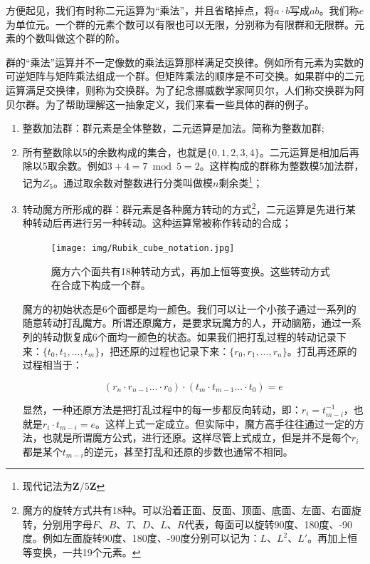 \documentclass[b5paper]{ctexart}
\begin{document}
方便起见，我们有时称二元运算为“乘法”，并且省略掉点，将$a \cdot b$写成$ab$。我们称$e$为单位元。一个群的元素个数可以有限也可以无限，分别称为有限群和无限群。元素的个数叫做这个群的阶。

群的“乘法”运算并不一定像数的乘法运算那样满足交换律。例如所有元素为实数的可逆矩阵与矩阵乘法组成一个群。但矩阵乘法的顺序是不可交换。如果群中的二元运算满足交换律，则称为交换群。为了纪念挪威数学家阿贝尔，人们称交换群为阿贝尔群。为了帮助理解这一抽象定义，我们来看一些具体的群的例子。

\begin{enumerate}
\item 整数加法群：群元素是全体整数，二元运算是加法。简称为整数加群;
\item 所有整数除以5的余数构成的集合，也就是$\{0, 1, 2, 3, 4\}$。二元运算是相加后再除以5取余数。例如$3 + 4 = 7 \bmod 5 = 2$。这样构成的群称为整数模5加法群，记为$Z_5$。通过取余数对整数进行分类叫做模$n$剩余类\footnote{现代记法为$\pmb{Z}/5\pmb{Z}$}；
\item 转动魔方所形成的群：群元素是各种魔方转动的方式\footnote{魔方的旋转方式共有18种。可以沿着正面、反面、顶面、底面、左面、右面旋转，分别用字母$F$、$B$、$T$、$D$、$L$、$R$代表，每面可以旋转90度、180度、-90度。例如左面旋转90度、180度、-90度分别可以记为：$L$、$L^2$、$L'$\cite{Wiki-Rubik-Cube-group}。再加上恒等变换，一共19个元素。}，二元运算是先进行某种转动后再进行另一种转动。这种运算常被称作转动的合成；

\begin{figure}[htbp]
 \centering
 \texttt{[image: img/Rubik\_cube\_notation.jpg]}
 \caption{魔方六个面共有18种转动方式，再加上恒等变换。这些转动方式在合成下构成一个群。}
 \label{fig:Rubik-cube-notation}
\end{figure}

魔方的初始状态是6个面都是均一颜色。我们可以让一个小孩子通过一系列的随意转动打乱魔方。所谓还原魔方，是要求玩魔方的人，开动脑筋，通过一系列的转动恢复成6个面均一颜色的状态。如果我们把打乱过程的转动记录下来：$\{t_0, t_1, ..., t_m\}$，把还原的过程也记录下来：$\{r_0, r_1, ..., r_n\}$。打乱再还原的过程相当于：

\[
  (r_n \cdot r_{n-1} ... \cdot r_0) \cdot (t_m \cdot t_{m-1} ... \cdot t_0) = e
\]

显然，一种还原方法是把打乱过程中的每一步都反向转动，即：$r_i = t_{m-i}^{-1}$，也就是$r_i \cdot t_{m-i} = e$。这样上式一定成立。但实际中，魔方高手往往通过一定的方法，也就是所谓魔方公式，进行还原。这样尽管上式成立，但是并不是每个$r_i$都是某个$t_{m-i}$的逆元，甚至打乱和还原的步数也通常不相同。


\end{enumerate}
\end{document}
